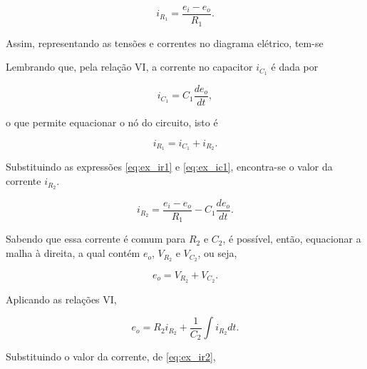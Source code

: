 \documentclass{article}
\numberwithin{equation}{section}
\let\dfr\dfrac
\begin{document}
\begin{equation}
    i_{R_1} = \dfr{e_i-e_o}{R_1}. \label{eq:ex_ir1}
\end{equation}

\noindent Assim, representando as tensões e correntes no diagrama elétrico, tem-se

\begin{center}
\end{center}

\noindent Lembrando que, pela relação VI, a corrente no capacitor $i_{C_1}$ é dada por

\begin{equation}
    i_{C_1} = C_1 \dfr{de_o}{dt}, \label{eq:ex_ic1}
\end{equation}

\noindent o que permite equacionar o nó do circuito, isto é

\begin{equation*}
    i_{R_1} = i_{C_1} + i_{R_2}.
\end{equation*}

\noindent Substituindo as expressões \eqref{eq:ex_ir1} e \eqref{eq:ex_ic1}, encontra-se o valor da corrente $i_{R_2}$.

\begin{equation}
    i_{R_2} = \dfr{e_i-e_o}{R_1} - C_1 \dfr{de_o}{dt}. \label{eq:ex_ir2}
\end{equation}

\noindent Sabendo que essa corrente é comum para $R_2$ e $C_2$, é possível, então, equacionar a malha à direita, a qual contém $e_o$, $V_{R_2}$ e $V_{C_2}$, ou seja,

\begin{equation*}
    e_o = V_{R_2} + V_{C_2}.
\end{equation*}

\noindent Aplicando as relações VI,

\begin{equation*}
    e_o = R_2i_{R_2} + \dfr{1}{C_2}\int i_{R_2}dt.
\end{equation*}

\noindent Substituindo o valor da corrente, de \eqref{eq:ex_ir2},
\end{document}
